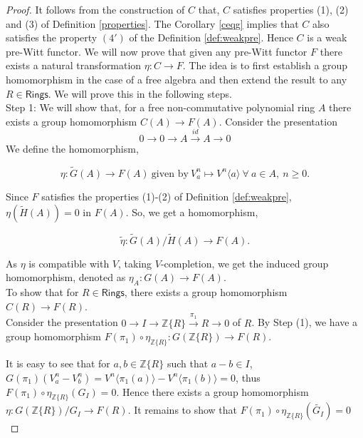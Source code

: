 \documentclass[11pt]{amsart}
\theoremstyle{plain}
\theoremstyle{definition}
\renewcommand{\tilde}{\widetilde}
\newcommand{\Z}{{\mathbb Z}}
\newcommand{\ab}[1]{\langle {#1} \rangle}
\newcommand{\Rings}{{\mathsf{Rings}}}
\begin{document}
\begin{proof} It follows from the construction of $C$ that, $C$ satisfies properties (1), (2) and (3) of Definition \ref{properties}. The Corollary \ref{ceqg} implies that $C$ also satisfies the property $(4')$ of the Definition \ref{def:weakpre}. Hence $C$ is a weak pre-Witt functor. We will now prove that given any pre-Witt functor $F$ there exists a natural transformation $\eta: C \to F$. The idea is to first establish a group homomorphism in the case of a free algebra and then extend the result to any $R \in \Rings$. We will prove this in the following steps. \\

\noindent Step 1: We will show that, for a free non-commutative polynomial ring $A$ there exists a group homomorphism $C(A) \to F(A)$. Consider the presentation $$0 \to 0 \to A \xrightarrow{id} A \to 0$$ We define the homomorphism, 

$$\eta : \tilde{G}(A) \to F(A) \ \text{given by} \  V^n_{a}  \mapsto V^n\ab{a} \ \forall \  a \in A, \ n \geq 0.$$ 

\vspace{1mm}
\noindent Since $F$ satisfies the properties (1)-(2) of Definition \ref{def:weakpre}, $\eta(\tilde{H}(A))=0$ in $F(A)$. So, we get a homomorphism,

 $$\tilde{\eta}:\tilde{G}(A)/\tilde{H}(A) \to F(A).$$ 
 
\vspace{1mm}
\noindent As $\eta$ is compatible with $V$, taking $V$-completion, we get the induced group homomorphism, denoted as $\eta_A: G(A) \to F(A)$. \\

 To show that for $R \in \Rings$, there exists a group homomorphism $C(R) \to F(R)$.\\

\noindent Consider the presentation $0 \to I \to \Z\{R\} \stackrel{\pi_1}{\longrightarrow} R \to 0$ of $R$. By Step (1), we have a group homomorphism $F(\pi_1) \circ \eta_{\Z\{R\}} : G(\Z\{R\}) \to F(R)$. \\
\vspace{2mm}

\noindent It is easy to see that for $a, b \in \Z\{R\}$ such that $a-b \in I$, $G(\pi_1)(V^n_a-V^n_b)= V^n\ab{\pi_1(a)}-V^n\ab{\pi_1(b)} = 0$, thus $F(\pi_1)\circ\eta_{\Z\{R\}}(G_I) = 0$. Hence there exists a group homomorphism $\eta: G(\Z\{R\})/G_I \to F(R)$. It remains to show that $F(\pi_1) \circ \eta_{\Z\{R\}}(\tilde{G_I}) = 0$ \ \\


\end{proof}
\end{document}
